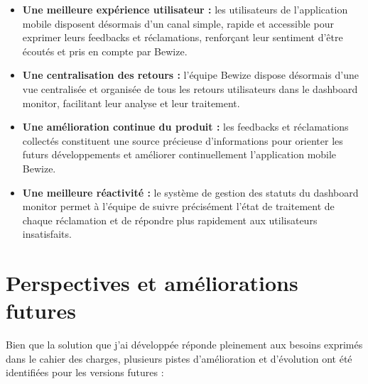 \begin{itemize}
    \item \textbf{Une meilleure expérience utilisateur :} les 
    utilisateurs de l'application mobile disposent désormais d'un 
    canal simple, rapide et accessible pour exprimer leurs feedbacks 
    et réclamations, renforçant leur sentiment d'être écoutés et 
    pris en compte par Bewize.
    
    \item \textbf{Une centralisation des retours :} l'équipe Bewize 
    dispose désormais d'une vue centralisée et organisée de tous 
    les retours utilisateurs dans le dashboard monitor, facilitant 
    leur analyse et leur traitement.
    
    \item \textbf{Une amélioration continue du produit :} les 
    feedbacks et réclamations collectés constituent une source 
    précieuse d'informations pour orienter les futurs développements 
    et améliorer continuellement l'application mobile Bewize.
    
    \item \textbf{Une meilleure réactivité :} le système de gestion 
    des statuts du dashboard monitor permet à l'équipe de suivre 
    précisément l'état de traitement de chaque réclamation et de 
    répondre plus rapidement aux utilisateurs insatisfaits.
\end{itemize}

\section{Perspectives et améliorations futures}
Bien que la solution que j'ai développée réponde pleinement aux 
besoins exprimés dans le cahier des charges, plusieurs pistes 
d'amélioration et d'évolution ont été identifiées pour les 
versions futures :

